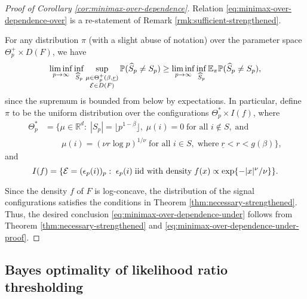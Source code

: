 \begin{proof}[Proof of Corollary \ref{cor:minimax-over-dependence}]
Relation \eqref{eq:minimax-over-dependence-over} is a re-statement of Remark \ref{rmk:sufficient-strengthened}.

For any distribution $\pi$ (with a slight abuse of notation) over the parameter space $\Theta_p^+\times D(F)$, we have
\begin{equation} \label{eq:minimax-over-dependence-under-proof}
    \liminf_{p\to\infty} \inf_{\widehat{S}_p} \sup_{\substack{\mu\in\Theta_p^+(\beta, \underline{r})\\ {\cal E}\in D(F)}} {\mathbb P}(\widehat{S}_p \neq S_p) 
\ge \liminf_{p\to\infty} \inf_{\widehat{S}_p} {\mathbb E}_{\pi} {\mathbb P}(\widehat{S}_p \neq S_p),
\end{equation}
since the supremum is bounded from below by expectations.
In particular, define $\pi$ to be the uniform distribution over the configurations $\Theta_p^*\times I(f)$, where
\begin{align*}
    \Theta_p^* &=
    \{\mu\in\mathbb{R}^d:\;|S_p|=\lfloor p^{1-\beta}\rfloor,\;\mu(i)=0\;\text{for all }i\not\in S, \;\text{and}\\
    &\quad\quad\mu(i) = (\nu{r}\log{p})^{1/\nu}\;\text{for all }i\in S,\;\text{where}\;\underline{r}<r<g(\beta)\},
\end{align*}
and 
\begin{equation*}
    I(f)=\{{\cal E}=(\epsilon_p(i))_p:\;\epsilon_p(i)\;\text{iid with density}\; f(x)\propto \exp\{-|x|^\nu/\nu\}\}.
\end{equation*}

Since the density $f$ of $F$ is log-concave, the distribution of the signal configurations satisfies the conditions in Theorem \ref{thm:necessary-strengthened}.
Thus, the desired conclusion \eqref{eq:minimax-over-dependence-under} follows from Theorem \ref{thm:necessary-strengthened} and \eqref{eq:minimax-over-dependence-under-proof}.
\end{proof}

\subsection{Bayes optimality of likelihood ratio thresholding}
\label{subsec:optimal-procedure-super-exponential}

